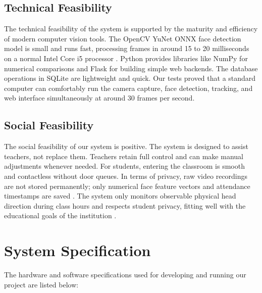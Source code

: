 \documentclass[10pt]{report}
\begin{document}
\subsection{Technical Feasibility}
\hspace{0.5cm}The technical feasibility of the system is supported by the maturity and efficiency of modern computer vision tools. The OpenCV YuNet ONNX face detection model is small and runs fast, processing frames in around 15 to 20 milliseconds on a normal Intel Core i5 processor \cite{zhang2023realtime}. Python provides libraries like NumPy for numerical comparisons and Flask for building simple web backends. The database operations in SQLite are lightweight and quick. Our tests proved that a standard computer can comfortably run the camera capture, face detection, tracking, and web interface simultaneously at around 30 frames per second.

\subsection{Social Feasibility}
\hspace{0.5cm}The social feasibility of our system is positive. The system is designed to assist teachers, not replace them. Teachers retain full control and can make manual adjustments whenever needed. For students, entering the classroom is smooth and contactless without door queues. In terms of privacy, raw video recordings are not stored permanently; only numerical face feature vectors and attendance timestamps are saved \cite{george2024edgeface}. The system only monitors observable physical head direction during class hours and respects student privacy, fitting well with the educational goals of the institution \cite{booth2023engagement}.

\section{System Specification}
\hspace{0.5cm}The hardware and software specifications used for developing and running our project are listed below:
\end{document}
